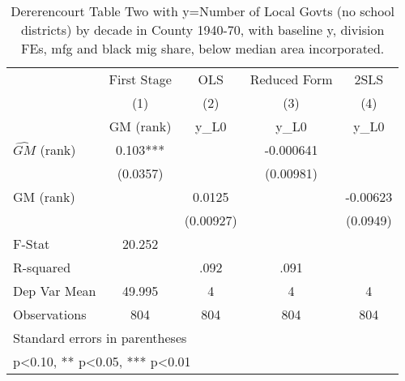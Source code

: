 \begin{table}[htbp]\centering
\def\sym#1{\ifmmode^{#1}\else\(^{#1}\)\fi}
\caption{Dererencourt Table Two with y=Number of Local Govts (no school districts) by decade in County 1940-70, with baseline y, division FEs, mfg and black mig share, below median area incorporated.}
\begin{tabular}{l*{4}{c}}
\toprule
                    & First Stage   &         OLS   &Reduced Form   &        2SLS   \\
                    &\multicolumn{1}{c}{(1)}&\multicolumn{1}{c}{(2)}&\multicolumn{1}{c}{(3)}&\multicolumn{1}{c}{(4)}\\
                    &\multicolumn{1}{c}{GM  (rank)}&\multicolumn{1}{c}{y\_L0}&\multicolumn{1}{c}{y\_L0}&\multicolumn{1}{c}{y\_L0}\\
\midrule
$\hat{GM}$ (rank)   &       0.103***&               &   -0.000641   &               \\
                    &    (0.0357)   &               &   (0.00981)   &               \\
\addlinespace
GM  (rank)          &               &      0.0125   &               &    -0.00623   \\
                    &               &   (0.00927)   &               &    (0.0949)   \\
\midrule
F-Stat              &      20.252   &               &               &               \\
R-squared           &               &        .092   &        .091   &               \\
Dep Var Mean        &      49.995   &           4   &           4   &           4   \\
Observations        &         804   &         804   &         804   &         804   \\
\bottomrule
\multicolumn{5}{l}{\footnotesize Standard errors in parentheses}\\
\multicolumn{5}{l}{\footnotesize * p<0.10, ** p<0.05, *** p<0.01}\\
\end{tabular}
\end{table}
